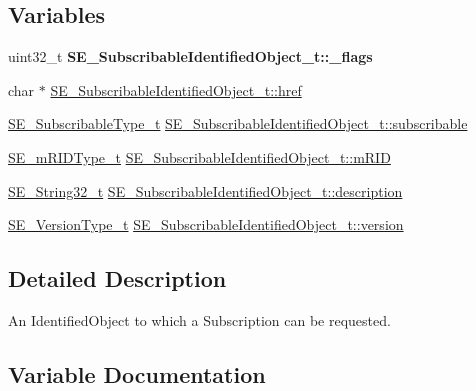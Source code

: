 \subsection*{Variables}
\begin{DoxyCompactItemize}
\item 
\mbox{\label{group__SubscribableIdentifiedObject_ga049b4d68d97332689d4697a3869136eb}} 
uint32\+\_\+t {\bfseries S\+E\+\_\+\+Subscribable\+Identified\+Object\+\_\+t\+::\+\_\+flags}
\item 
char $\ast$ \hyperlink{group__SubscribableIdentifiedObject_gaa2fe2542f71e3344bd7da8a0505a0264}{S\+E\+\_\+\+Subscribable\+Identified\+Object\+\_\+t\+::href}
\item 
\hyperlink{group__SubscribableType_ga5c41f553d369710ed34619266bf2551e}{S\+E\+\_\+\+Subscribable\+Type\+\_\+t} \hyperlink{group__SubscribableIdentifiedObject_gad1ef79a6cf69c3477a8dea9e68d85663}{S\+E\+\_\+\+Subscribable\+Identified\+Object\+\_\+t\+::subscribable}
\item 
\hyperlink{group__mRIDType_gac74622112f3a388a2851b2289963ba5e}{S\+E\+\_\+m\+R\+I\+D\+Type\+\_\+t} \hyperlink{group__SubscribableIdentifiedObject_gabbd15aaa5ff966d28a471469529cbbb5}{S\+E\+\_\+\+Subscribable\+Identified\+Object\+\_\+t\+::m\+R\+ID}
\item 
\hyperlink{group__String32_gac9f59b06b168b4d2e0d45ed41699af42}{S\+E\+\_\+\+String32\+\_\+t} \hyperlink{group__SubscribableIdentifiedObject_ga8521a2f1372171feb07ee6bac680c5a5}{S\+E\+\_\+\+Subscribable\+Identified\+Object\+\_\+t\+::description}
\item 
\hyperlink{group__VersionType_ga4b8d27838226948397ed99f67d46e2ae}{S\+E\+\_\+\+Version\+Type\+\_\+t} \hyperlink{group__SubscribableIdentifiedObject_gac02228152f017ea425ff1f68de5d7832}{S\+E\+\_\+\+Subscribable\+Identified\+Object\+\_\+t\+::version}
\end{DoxyCompactItemize}


\subsection{Detailed Description}
An Identified\+Object to which a Subscription can be requested. 

\subsection{Variable Documentation}
\mbox{\label{group__SubscribableIdentifiedObject_ga8521a2f1372171feb07ee6bac680c5a5}} 
